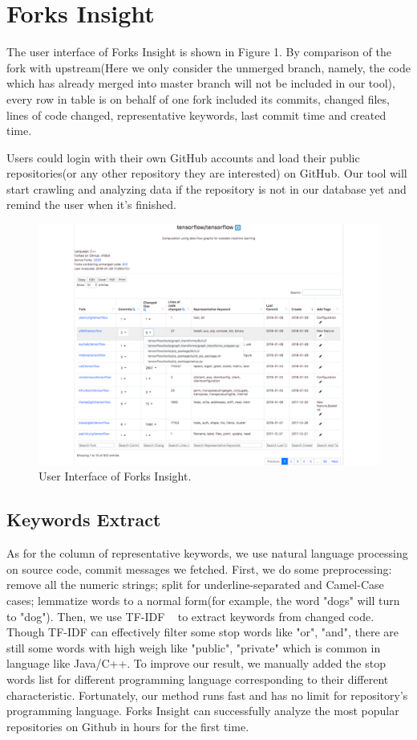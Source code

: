 \section{Forks Insight}

The user interface of Forks Insight is shown in Figure 1. By comparison of the fork with upstream(Here we only consider the unmerged branch, namely, the code which has already merged into master branch will not be included in our tool), every row in table is on behalf of one fork included its commits, changed files, lines of code changed, representative keywords, last commit time and created time.


Users could login with their own GitHub accounts and load their public repositories(or any other repository they are interested) on GitHub. Our tool will start crawling and analyzing data if the repository is not in our database yet and remind the user when it's finished. 

\begin{figure}[H]
\includegraphics[scale=0.3]{tensorflow_snapshot3.pdf}
\caption{User Interface of Forks Insight.}
\end{figure}

\subsection{Keywords Extract}
As for the column of representative keywords, we use natural language processing on source code, commit messages we fetched. First, we do some preprocessing: remove all the numeric strings; split for underline-separated and Camel-Case cases; lemmatize words to a normal form(for example, the word "dogs" will turn to "dog"). Then, we use TF-IDF ~\cite{salton1988term} to extract keywords from changed code. Though TF-IDF can effectively filter some stop words like "or", "and", there are still some words with high weigh like "public", "private" which is common in language like Java/C++. To improve our result, we manually added the stop words list for different programming language corresponding to their different characteristic.
Fortunately, our method runs fast and has no limit for repository's programming language. Forks Insight can successfully analyze the most popular repositories on Github in hours for the first time.

